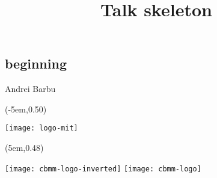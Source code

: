 \newcommand{\darkmode}{}




\title[skeleton]{Talk skeleton}

\author[Andrei Barbu]{}

\institute[MIT]{}

\date[August, 2018]{}


\lsstyle

\subsection{beginning}
\begin{frame}[plain]
  \titlepage
  \begin{center}
    \vspace{3ex}
    Andrei Barbu
    \begin{textblock*}{\paperwidth}(-5em,0.50\textheight)
      \begin{footnotesize}
        \texttt{[image: logo-mit]}
      \end{footnotesize}
    \end{textblock*}
    \begin{textblock*}{\paperwidth}(5em,0.48\textheight)
      \begin{footnotesize}
        \ifdefined\darkmode
        \texttt{[image: cbmm-logo-inverted]}
        \else
        \texttt{[image: cbmm-logo]}
        \fi
      \end{footnotesize}
    \end{textblock*}
  \end{center}
\end{frame}

\begin{frame}[plain]
  \centering
\end{frame}


